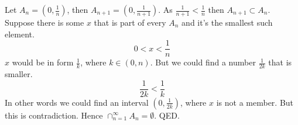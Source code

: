 \documentclass{article}
\begin{document}
Let $A_{n}=\left(0,\frac{1}{n}\right)$, then $A_{n+1}=\left(0,\frac{1}{n+1}\right)$. As $\frac{1}{n+1}<\frac{1}{n}$ then $A_{n+1}\subset A_{n}$.
\newline
\newline
Suppose there is some $x$ that is part of every $A_{n}$ and it's the smallest such element.
$$0<x<\frac{1}{n}$$
$x$ would be in form $\frac{1}{k}$, where $k \in \left(0,n\right)$. But we could find a number $\frac{1}{2k}$ that is smaller.
$$\frac{1}{2k}<\frac{1}{k}$$
In other words we could find an interval $\left(0,\frac{1}{2k}\right)$, where $x$ is not a member. But this is contradiction. Hence $\cap_{n=1}^{\infty}A_{n}=\emptyset$.
\newline
QED.
\end{document}
